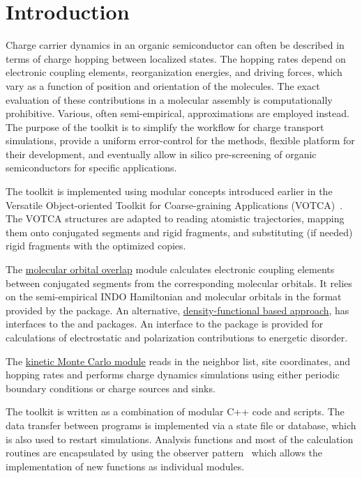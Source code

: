 \chapter{Introduction}
\label{sec:introduction}

Charge carrier dynamics in an organic semiconductor can often be described in terms of charge hopping between localized states. The hopping rates depend on electronic coupling elements, reorganization energies, and driving forces, which vary as a function of position and orientation of the molecules.  The exact evaluation of these contributions in a molecular assembly is computationally prohibitive. Various, often semi-empirical, approximations are employed instead. The purpose of the toolkit is to simplify the workflow for charge transport simulations, provide a uniform error-control for the methods, flexible platform for their development, and eventually allow in silico pre-screening of organic semiconductors for specific applications. 

The toolkit is implemented using modular concepts introduced earlier in the Versatile Object-oriented Toolkit for Coarse-graining Applications (VOTCA)~\cite{ruehle_versatile_2009}. The VOTCA structures are adapted to reading atomistic trajectories, mapping them onto conjugated segments and rigid fragments, and substituting (if needed) rigid fragments with the optimized copies. 

The \hyperref[sec:moo]{molecular orbital overlap} module calculates electronic coupling elements between  conjugated segments from the corresponding molecular orbitals. It relies on the semi-empirical INDO Hamiltonian and molecular orbitals in the format provided by the \gaussian package. An alternative,  \hyperref[sec:dft]{density-functional based approach}, has interfaces to the \gaussian and \turbomole packages. An interface to the \tinker package is provided for calculations of electrostatic and polarization contributions to energetic disorder. 

The  \hyperref[sec:kmc]{kinetic Monte Carlo module} reads in the neighbor list, site coordinates, and hopping rates and performs charge dynamics simulations using either periodic boundary conditions or charge sources and sinks. 

The toolkit is written as a combination of modular C++ code and scripts. The data transfer between programs is implemented via a state file or database, which is also used to restart simulations. Analysis functions and most of the calculation routines are encapsulated by using the observer pattern~\cite{gamma_design_1995} which allows the implementation of new functions as individual modules.